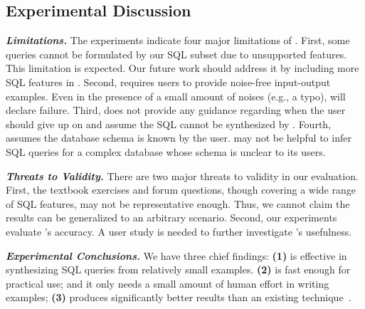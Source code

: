\vspace{-1mm}
\subsection{Experimental Discussion}
\vspace{-1mm}


\noindent \textbf{\textit{Limitations.}}
The experiments indicate four major limitations
of \ourtool. First, some queries
cannot be formulated by our SQL subset
due to unsupported features. This limitation is expected.
Our future work should address it by including more SQL
features in \ourtool. Second, \ourtool requires
users to provide noise-free input-output examples.
Even in the presence of a small amount of 
noises (e.g., a typo), \ourtool will declare failure.
Third, \ourtool does not provide any guidance regarding
when the user should give up on \ourtool and assume
the SQL cannot be synthesized by \ourtool.
Fourth, \ourtool assumes the database schema is
known by the user. \ourtool may not be helpful to infer
SQL queries for a complex database whose schema is
unclear to its users.

\vspace{.5mm}
\noindent \textbf{\textit{Threats to Validity.}}
There are two major threats to validity
in our evaluation. First, the \exnum textbook exercises
and \pnum forum questions, though covering
a wide range of SQL features, may not be representative enough.
Thus, we cannot claim the results can be generalized to an
arbitrary scenario. Second, our
experiments evaluate \ourtool's accuracy.
A user study is needed to further investigate
\ourtool's usefulness.


\vspace{.5mm}
\noindent \textbf{\textit{Experimental Conclusions.}}
We have three chief findings: \textbf{(1)}
\ourtool is effective in synthesizing SQL queries
from relatively small examples.
\textbf{(2)} \ourtool is fast enough for practical use;
and it only needs a small amount of human
effort in writing examples;
\textbf{(3)} \ourtool produces significantly better results
than an existing technique~\cite{Tran:2009}.




